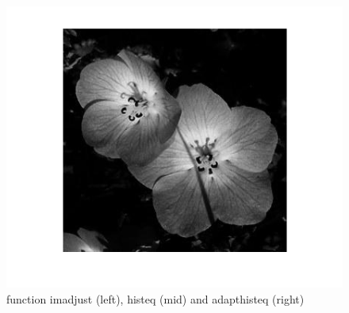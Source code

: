 \documentclass{scrartcl}
\begin{document}
\begin{figure}[htp!]
\begin{minipage}[t]{0.3\textwidth}
	\end{minipage}
	\begin{minipage}[t]{0.3\textwidth}
		\includegraphics[width=\textwidth]{flower_adapt.png}
	\end{minipage}
	\caption{function imadjust (left), histeq (mid) and adapthisteq (right)}
\end{figure}

\end{document}
